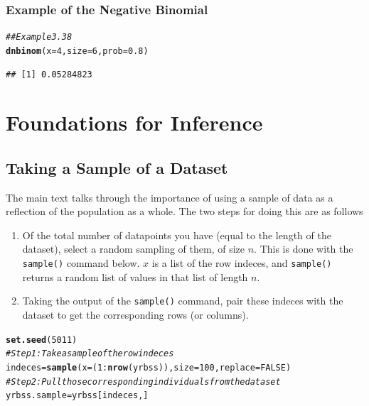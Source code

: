 \documentclass{report}\usepackage[]{graphicx}\usepackage[]{color}
\makeatletter
\newcommand{\hlnum}[1]{\textcolor[rgb]{0.686,0.059,0.569}{#1}}%
\newcommand{\hlcom}[1]{\textcolor[rgb]{0.678,0.584,0.686}{\textit{#1}}}%
\newcommand{\hlopt}[1]{\textcolor[rgb]{0,0,0}{#1}}%
\newcommand{\hlstd}[1]{\textcolor[rgb]{0.345,0.345,0.345}{#1}}%
\newcommand{\hlkwb}[1]{\textcolor[rgb]{0.69,0.353,0.396}{#1}}%
\newcommand{\hlkwc}[1]{\textcolor[rgb]{0.333,0.667,0.333}{#1}}%
\newcommand{\hlkwd}[1]{\textcolor[rgb]{0.737,0.353,0.396}{\textbf{#1}}}%
\newenvironment{kframe}{%
 \def\at@end@of@kframe{}%
 \ifinner\ifhmode%
  \def\at@end@of@kframe{\end{minipage}}%
  \begin{minipage}{\columnwidth}%
 \fi\fi%
 \def\FrameCommand##1{\hskip\@totalleftmargin \hskip-\fboxsep
 \colorbox{shadecolor}{##1}\hskip-\fboxsep
     \hskip-\linewidth \hskip-\@totalleftmargin \hskip\columnwidth}%
 \MakeFramed {\advance\hsize-\width
   \@totalleftmargin\z@ \linewidth\hsize
   \@setminipage}}%
 {\par\unskip\endMakeFramed%
 \at@end@of@kframe}
\newenvironment{knitrout}{}{} %
\makeatother
\begin{document}
\subsection{Example of the Negative Binomial}

\begin{knitrout}
\color{fgcolor}\begin{kframe}
\begin{alltt}
\hlcom{## Example 3.38 }
\hlkwd{dnbinom}\hlstd{(}\hlkwc{x} \hlstd{=} \hlnum{4}\hlstd{,} \hlkwc{size} \hlstd{=} \hlnum{6}\hlstd{,} \hlkwc{prob} \hlstd{=} \hlnum{0.8}\hlstd{)}
\end{alltt}
\begin{verbatim}
## [1] 0.05284823
\end{verbatim}
\end{kframe}
\end{knitrout}


\newpage
\chapter{Foundations for Inference}
\minitoc

\vspace{0.5cm} 

\section*{Taking a Sample of a Dataset}
The main text talks through the importance of using a sample of data as a reflection of the population as a whole.  The two steps for doing this are as follows
\begin{enumerate}
\item Of the total number of datapoints you have (equal to the length of the dataset), select a random sampling of them, of size $n$.  This is done with the \texttt{sample()} command below.  $x$ is a list of the row indeces, and \texttt{sample()} returns a random list of values in that list of length $n$. 
\item Taking the output of the \texttt{sample()} command, pair these indeces with the dataset to get the corresponding rows (or columns).  
\end{enumerate}

\begin{knitrout}
\color{fgcolor}\begin{kframe}
\begin{alltt}
\hlkwd{set.seed}\hlstd{(}\hlnum{5011}\hlstd{)}
\hlcom{# Step 1: Take a sample of the row indeces }
\hlstd{indeces} \hlkwb{=} \hlkwd{sample}\hlstd{(}\hlkwc{x} \hlstd{= (}\hlnum{1}\hlopt{:}\hlkwd{nrow}\hlstd{(yrbss)),} \hlkwc{size} \hlstd{=} \hlnum{100}\hlstd{,} \hlkwc{replace} \hlstd{=} \hlnum{FALSE}\hlstd{)}
\hlcom{# Step 2: Pull those corresponding individuals from the dataset }
\hlstd{yrbss.sample} \hlkwb{=} \hlstd{yrbss[indeces,]}
\end{alltt}
\end{kframe}
\end{knitrout}
\end{document}

